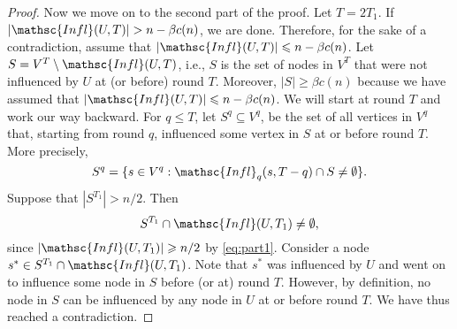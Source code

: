 \documentclass[leqno,11pt]{article}
\renewcommand{\ge}{\geqslant}
\renewcommand{\le}{\leqslant}
\newcommand{\set}[1]{\{#1\}}
\newcommand{\infl}{{\mathsc{Infl}}}
\begin{document}
{\begin{proof}
Now we move on to the second part of the proof. Let $T = 2 T_1$.
If $|\infl(U,T)| > n - \beta c(n)$, we are done.
Therefore, for the sake of a contradiction,  assume that  $|\infl(U,T)| \le 
n-\beta  c(n)$. Let $S = V^{T} \setminus \infl(U,T)$, i.e., $S$ is the set of nodes in $V^T$ that were not influenced by $U$ at (or before) round $T$. 
Moreover, $|S| \ge \beta c(n)$ because we have assumed that $|\infl(U,T)| \le
n-\beta  c(n)$. We will start at round $T$ and work our way
backward. For $q \le T$, let $S^q \subseteq V^{q}$, be the set of
all vertices in $V^q$ that, starting from round $q$, influenced  some vertex in $S$ at or
before round $T$. More precisely, \[S^q = \set{s \in V^{q} : 
\infl_{q}(s, T - q) \cap S \ne \emptyset}.\]
Suppose that $|S^{T_1}| > n/2$. Then 
\begin{equation*}S^{T_1} \cap \infl(U,T_1) \ne \emptyset\text{,}\end{equation*}
since $|\infl(U,T_1)| \ge n/2$ by
\eqref{eq:part1}. Consider a node
$s^* \in  S^{T_1} \cap \infl(U,T_1)$. Note that $s^*$ was influenced by $U$ and went
on to influence some node in $S$ before (or at) round $T$. However, by definition, no node  in $S$ can be influenced by any node in $U$ at or before round $T$. We have thus reached a contradiction. 


\end{proof}}
\end{document}
